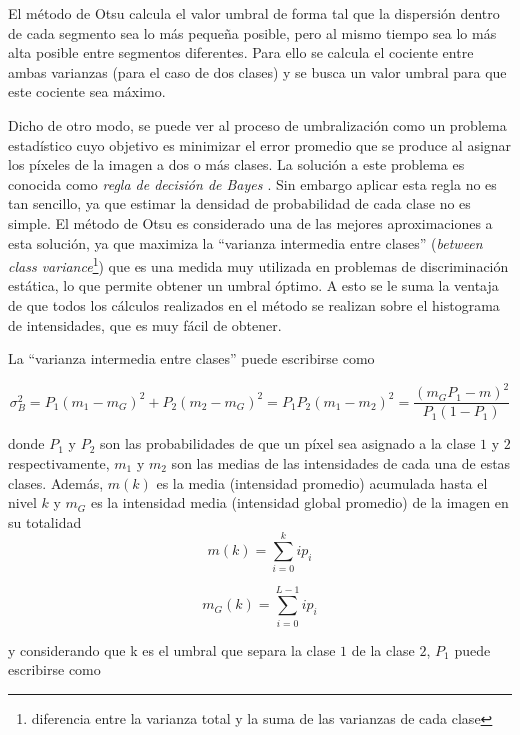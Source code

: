 El método de Otsu \cite{otsu} calcula el valor umbral de forma tal que la dispersión dentro de cada segmento sea lo más pequeña posible, pero al mismo tiempo sea lo más alta posible entre segmentos diferentes. Para ello se calcula el cociente entre ambas varianzas (para el caso de dos clases) y se busca un valor umbral para que este cociente sea máximo.

Dicho de otro modo, se puede ver al proceso de umbralización como un problema estadístico cuyo objetivo es minimizar el error promedio que se produce al asignar los píxeles de la imagen a dos o más clases. La solución a este problema es conocida como \textit{regla de decisión de Bayes \cite{bayes}}. Sin embargo aplicar esta regla no es tan sencillo, ya que estimar la densidad de probabilidad de cada clase no es simple. El método de Otsu es considerado una de las mejores aproximaciones a esta solución, ya que maximiza la ``varianza intermedia entre clases'' (\textit{between class variance}\footnote{diferencia entre la varianza total y la suma de las varianzas de cada clase\cite{betweenvarianze}}) que es una medida muy utilizada en problemas de discriminación estática, lo que permite obtener un umbral óptimo. A esto se le suma la ventaja de que todos los cálculos realizados en el método se realizan sobre el histograma de intensidades, que es muy fácil de obtener.


La ``varianza intermedia entre clases'' puede escribirse como

\begin{equation}
{\sigma}_B^2 = P_1(m_1-m_G)^2 + P_2(m_2-m_G)^2 = P_1P_2(m_1-m_2)^2 = \frac{(m_GP_1 - m)^2}{P_1(1-P_1)}
\label{betvarec}
\end{equation}

donde $P_1$ y $P_2$ son las probabilidades de que un píxel sea asignado a la clase $1$ y $2$ respectivamente, $m_1$ y $m_2$ son las medias de las intensidades de cada una de estas clases. Además, $m(k)$ es la media (intensidad promedio) acumulada  hasta el nivel $k$ y $m_G$ es la intensidad media (intensidad global promedio) de la imagen en su totalidad
\begin{equation}
m(k) = \sum_{i=0}^{k}ip_i
\label{mediacumulativa}
\end{equation}

\begin{equation}
m_G(k) = \sum_{i=0}^{L-1}ip_i
\label{mediaglobal}
\end{equation}

y considerando que k es el umbral que separa la clase $1$ de la clase $2$, $P_1$ puede escribirse como

